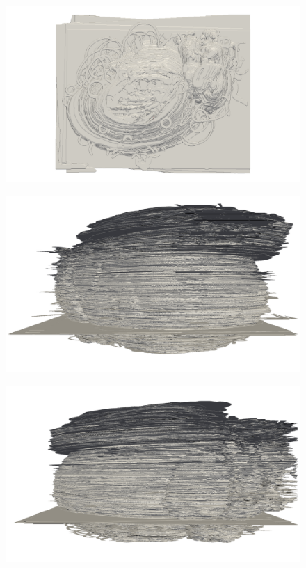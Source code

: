 \begin{figure}
  \centering
  \includegraphics[width=0.9\textheight]{Ch7/Figs/Rat28/contours/whole_positive_z_rigid}
  \caption{}
  \label{fig:image1.png}
\end{figure}

\begin{figure}
  \centering
  \includegraphics[width=0.9\textheight]{Ch7/Figs/Rat28/contours/whole_positive_x_size}
  \caption{}
  \label{fig:image1.png}
\end{figure}

\begin{figure}
  \centering
  \includegraphics[width=0.9\textheight]{Ch7/Figs/Rat28/contours/whole_negative_x_size}
  \caption{}
  \label{fig:image1.png}
\end{figure}

